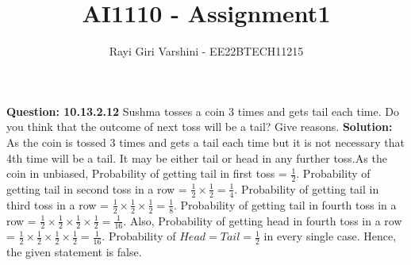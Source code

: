 \documentclass[journal,12pt,twocolumn]{IEEEtran}
\begin{document}
\title{AI1110 - Assignment1}
\author{Rayi Giri Varshini - EE22BTECH11215}	
\maketitle
\textbf{Question: 10.13.2.12}
Sushma tosses a coin 3 times and gets tail each time. Do you think that the outcome of next toss will be a tail? Give reasons.
\textbf{Solution:}
As the coin is tossed 3 times and gets a tail each time but it is not necessary that 4th time will be a tail. It may be either tail or head in any
further toss.\newline As the coin in unbiased,
\newline
Probability of getting tail in first toss = $\frac{1}{2}$.
\newline
Probability of getting tail in second toss in a row = $\frac{1}{2} \times \frac{1}{2} = \frac{1}{4}$.
\newline
Probability of getting tail in third toss in a row = $\frac{1}{2} \times \frac{1}{2} \times \frac{1}{2} = \frac{1}{8}$.
\newline
Probability of getting tail in fourth toss in a row = $\frac{1}{2} \times \frac{1}{2} \times \frac{1}{2} \times \frac{1}{2} = \frac{1}{16}$.
\newline
Also, Probability of getting head in fourth toss in a row = $\frac{1}{2} \times \frac{1}{2} \times \frac{1}{2} \times \frac{1}{2} = \frac{1}{16}$.
\newline
\newline
Probability of $Head = Tail = \frac{1}{2} $ in every single case.
\newline 
Hence, the given statement is false.
\end{document}
